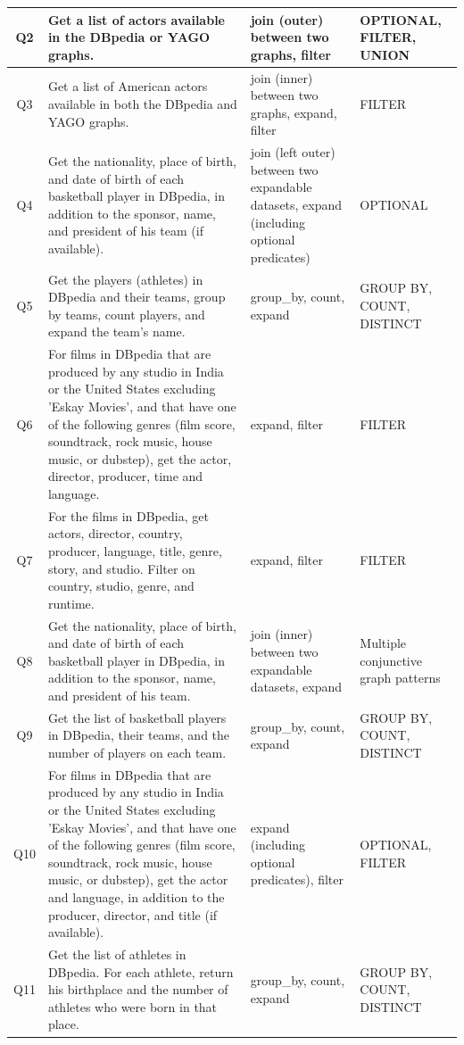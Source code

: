\begin{table}[th!]
{\begin{tabular}{|c|p{10cm}|p{4cm}|p{3cm}|}
    Q2 & Get a list of actors available in the DBpedia or YAGO graphs. & join (outer) between two graphs, filter & OPTIONAL, FILTER, UNION
    \\
    \hline
    Q3 & Get a list of American actors available in both the DBpedia and YAGO graphs. & join (inner) between two graphs, expand, filter &  FILTER
    \\
    \hline 
    Q4 & 
    Get the nationality, place of birth, and date of birth of each basketball player in DBpedia, in addition to the sponsor, name, and president of his team (if available). & join (left outer) between two expandable datasets, expand (including optional predicates) & OPTIONAL
    \\
    \hline 
    Q5 &  Get the players (athletes) in DBpedia and their teams, group by teams, count players, and expand the team's name. &  group\_by, count, expand & GROUP BY, COUNT, DISTINCT
    \\
    \hline
    Q6 &  For films in DBpedia that are produced by any studio in India or the United States excluding 'Eskay Movies', and that have one of the following genres (film score, soundtrack, rock music, house music, or dubstep),
    get the actor, director, producer, time and language. & expand, filter & FILTER
    \\ 
    \hline
    Q7 & For the films in DBpedia, get actors, director, country, producer, language, title, genre, story, and studio. Filter on country, studio, genre, and runtime. &  expand, filter & FILTER
    \\
    \hline
    Q8 & Get the nationality, place of birth, and date of birth of each basketball player in DBpedia, in addition to the sponsor, name, and president of his team. & join (inner) between two expandable datasets, expand & Multiple conjunctive graph patterns
    \\
    \hline 
    Q9 & Get the list of basketball players in DBpedia, their teams, and the number of players on each team. &  group\_by, count, expand & GROUP BY, COUNT, DISTINCT
    \\
    \hline
    Q10 &  For films in DBpedia that are produced by any studio in India or the United States excluding 'Eskay Movies', and that have one of the following genres (film score, soundtrack, rock music, house music, or dubstep),
    get the actor and language, in addition to the producer, director, and title (if available). & expand (including optional predicates), filter & OPTIONAL, FILTER
    \\ 
    \hline
    Q11 & Get the list of athletes in DBpedia. For each athlete, return his birthplace and the number of athletes who were born in that place. &  group\_by, count, expand & GROUP BY, COUNT, DISTINCT

\end{tabular}}
\end{table}
